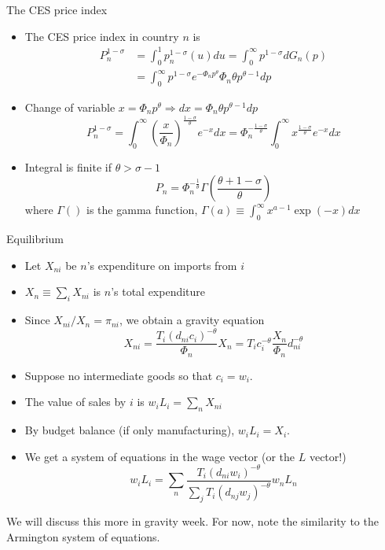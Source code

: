 \documentclass[11pt,notes=hide,aspectratio=169]{beamer}
\begin{document}
\begin{frame}{The CES price index}
\begin{itemize}
\item The CES price index in country $n$ is 
\begin{align*}
P_{n}^{1-\sigma } 
&=\int_{0}^{1}p_{n}^{1-\sigma }(u) du 
=\int_{0}^{\infty }p^{1-\sigma }dG_{n}\left( p\right) \\
&=\int_{0}^{\infty }p^{1-\sigma }e^{-\Phi _{n}p^{\theta }}\Phi _{n}\theta
p^{\theta -1}dp
\end{align*}
\item Change of variable $x=\Phi _{n}p^{\theta }\Rightarrow
dx=\Phi _{n}\theta p^{\theta -1}dp$
\begin{equation*}
P_{n}^{1-\sigma }
=\int_{0}^{\infty }\left( \frac{x}{\Phi _{n}}\right) ^{\frac{1-\sigma }{\theta }}e^{-x}dx
=\Phi _{n}^{-\frac{1-\sigma }{\theta }}\int_{0}^{\infty }x^{\frac{1-\sigma 
}{\theta }}e^{-x}dx
\end{equation*}
\item Integral is finite if $\theta>\sigma-1$
\begin{equation*}
P_{n} = \Phi _{n}^{-\frac{1}{\theta }} \Gamma \left( \frac{\theta +1-\sigma }{\theta }\right)
\end{equation*}
where $\Gamma()$ is the gamma function, $\Gamma(a)\equiv \int_{0}^{\infty} x^{a-1} \exp(-x)dx$
\end{itemize}
\end{frame}
\begin{frame}{Equilibrium}
\begin{itemize}
	\item Let $X_{ni}$ be $n$'s expenditure on imports from $i$
	\item $X_n \equiv \sum_{i} X_{ni}$ is $n$'s total expenditure
	\item Since $X_{ni} / X_n = \pi_{ni}$, we obtain a gravity equation
	\begin{equation*} 
	X_{ni} 
	= \frac{T_{i}\left( d _{ni}c_{i}\right) ^{-\theta}}{\Phi_n} X_n 
	= T_{i}c_{i}^{-\theta} \frac{X_n}{\Phi_n} d_{ni}^{-\theta} 
	\end{equation*}
	\item Suppose no intermediate goods so that $c_i = w_i$.
	\item The value of sales by $i$ is $w_i L_i = \sum_{n} X_{ni}$
	\item By budget balance (if only manufacturing), $w_i L_i = X_i$.
	\item We get a system of equations in the wage vector (or the $L$ vector!)
		\begin{equation*}w_i L_i = \sum_n \frac{T_{i}\left( d _{ni}w_{i}\right) ^{-\theta}}{\sum _j T_{i}\left( d _{nj}w_{j}\right) ^{-\theta}} w_n L_n
		\end{equation*}
\end{itemize}
We will discuss this more in gravity week. For now, note the similarity to the Armington system of equations.
\end{frame}
\end{document}
